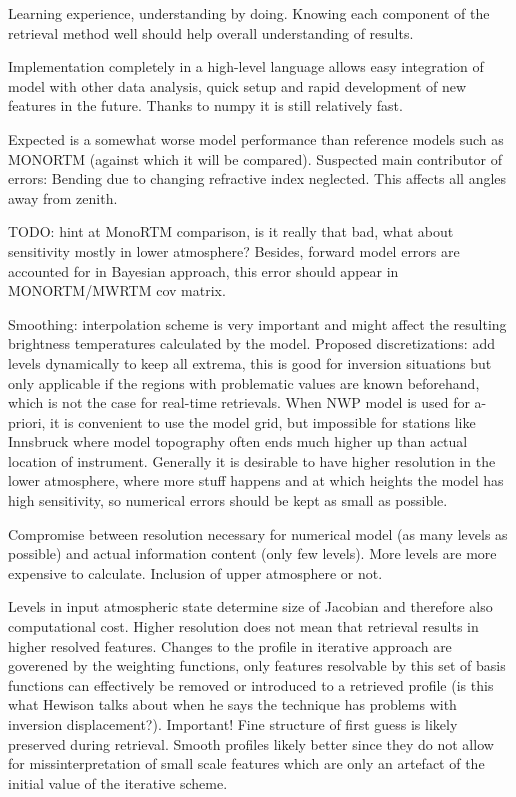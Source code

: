         Learning experience, understanding by doing. Knowing each component of
        the retrieval method well should help overall understanding of results.
        
        Implementation completely in a high-level language allows easy
        integration of model with other data analysis, quick setup and rapid
        development of new features in the future. Thanks to numpy it is still
        relatively fast.

        Expected is a somewhat worse model performance than reference models
        such as MONORTM (against which it will be compared). Suspected main
        contributor of errors: Bending due to changing refractive index
        neglected. This affects all angles away from zenith. 

        TODO: hint at MonoRTM comparison, is it really that bad, what about
        sensitivity mostly in lower atmosphere? Besides, forward model errors
        are accounted for in Bayesian approach, this error should appear in
        MONORTM/MWRTM cov matrix.
        
    \stopsubsection

    \startsubsection[title=Discretization and Interpolation]

        Smoothing: interpolation scheme is very important and might affect the
        resulting brightness temperatures calculated by the model. Proposed
        discretizations: add levels dynamically to keep all extrema, this is
        good for inversion situations but only applicable if the regions with
        problematic values are known beforehand, which is not the case for
        real-time retrievals. When NWP model is used for a-priori, it is
        convenient to use the model grid, but impossible for stations like
        Innsbruck where model topography often ends much higher up than
        actual location of instrument. Generally it is desirable to have higher
        resolution in the lower atmosphere, where more stuff happens and
        at which heights the model has high sensitivity, so numerical errors
        should be kept as small as possible.

        Compromise between resolution necessary for numerical model (as many
        levels as possible) and actual information content (only few levels).
        More levels are more expensive to calculate. Inclusion of upper
        atmosphere or not.

        Levels in input atmospheric state determine size of Jacobian and
        therefore also computational cost. Higher resolution does not mean
        that retrieval results in higher resolved features. Changes to the
        profile in iterative approach are goverened by the weighting functions,
        only features resolvable by this set of basis functions can effectively
        be removed or introduced to a retrieved profile (is this what Hewison
        talks about when he says the technique has problems with inversion
        displacement?). Important! Fine structure of first guess is likely
        preserved during retrieval. Smooth profiles likely better since they
        do not allow for missinterpretation of small scale features which are
        only an artefact of the initial value of the iterative scheme.

